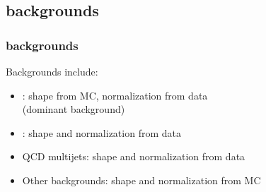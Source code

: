 \documentclass[bigger]{beamer}
\begin{document}
\subsection{\eejj backgrounds}
\label{sec-2-2}
\begin{frame}
\frametitle{\eejj backgrounds}
\label{sec-2-2-1}
\begin{block}{Backgrounds include:}
\label{sec-2-2-1-1}
\begin{itemize}

\item \zjets: shape from MC, normalization from data \\ (dominant background)
\label{sec-2-2-1-1-1}%

\item \ttbar: shape and normalization from data
\label{sec-2-2-1-1-2}%

\item QCD multijets: shape and normalization from data
\label{sec-2-2-1-1-3}%

\item Other backgrounds: shape and normalization from MC
\label{sec-2-2-1-1-4}%
\end{itemize} %
\end{block}
\end{frame}
\end{document}
